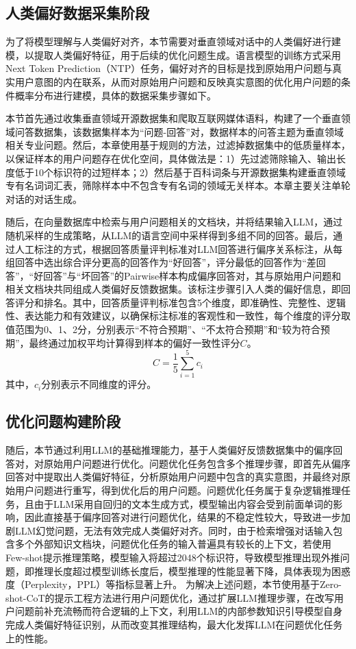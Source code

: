 \subsection{人类偏好数据采集阶段}

为了将模型理解与人类偏好对齐，本节需要对垂直领域对话中的人类偏好进行建模，以提取人类偏好特征，用于后续的优化问题生成。语言模型的训练方式采用Next Token Prediction（NTP）任务，偏好对齐的目标是找到原始用户问题与真实用户意图的内在联系，从而对原始用户问题和反映真实意图的优化用户问题的条件概率分布进行建模，具体的数据采集步骤如下。

本节首先通过收集垂直领域开源数据集和爬取互联网媒体语料，构建了一个垂直领域问答数据集，该数据集样本为“问题-回答”对，数据样本的问答主题为垂直领域相关专业问题。然后，本章使用基于规则的方法，过滤掉数据集中的低质量样本，以保证样本的用户问题存在优化空间，具体做法是：1）先过滤筛除输入、输出长度低于10个标识符的过短样本；2）然后基于百科词条与开源数据集构建垂直领域专有名词词汇表，筛除样本中不包含专有名词的领域无关样本。本章主要关注单轮对话的对话生成。

随后，在向量数据库中检索与用户问题相关的文档块，并将结果输入LLM，通过随机采样的生成策略，从LLM的语言空间中采样得到多组不同的回答。最后，通过人工标注的方式，根据回答质量评判标准对LLM回答进行偏序关系标注，从每组回答中选出综合评分更高的回答作为“好回答”，评分最低的回答作为“差回答”，“好回答”与“坏回答”的Pairwise样本构成偏序回答对，其与原始用户问题和相关文档块共同组成人类偏好反馈数据集。该标注步骤引入人类的偏好信息，即回答评分和排名。其中，回答质量评判标准包含5个维度，即准确性、完整性、逻辑性、表达能力和有效建议，以确保标注标准的客观性和一致性，每个维度的评分取值范围为0、1、2分，分别表示“不符合预期”、“不太符合预期”和“较为符合预期”，最终通过加权平均计算得到样本的偏好一致性评分$C$。
\begin{equation}
	C = \frac{1}{5}\sum_{i=1}^{5}c_i
\end{equation}
其中，$c_i$分别表示不同维度的评分。

\subsection{优化问题构建阶段}

随后，本节通过利用LLM的基础推理能力，基于人类偏好反馈数据集中的偏序回答对，对原始用户问题进行优化。问题优化任务包含多个推理步骤，即首先从偏序回答对中提取出人类偏好特征，分析原始用户问题中包含的真实意图，并最终对原始用户问题进行重写，得到优化后的用户问题。问题优化任务属于复杂逻辑推理任务，且由于LLM采用自回归的文本生成方式，模型输出内容会受到前面单词的影响，因此直接基于偏序回答对进行问题优化，结果的不稳定性较大，导致进一步加剧LLM幻觉问题，无法有效完成人类偏好对齐。同时，由于检索增强对话输入包含多个外部知识文档块，问题优化任务的输入普遍具有较长的上下文，若使用Few-shot提示推理策略，模型输入将超过2048个标识符，导致模型推理出现外推问题，即推理长度超过模型训练长度后，模型推理的性能显著下降，具体表现为困惑度（Perplexity，PPL）等指标显著上升。
为解决上述问题，本节使用基于Zero-shot-CoT的提示工程方法进行用户问题优化，通过扩展LLM推理步骤，在改写用户问题前补充流畅而符合逻辑的上下文，利用LLM的内部参数知识引导模型自身完成人类偏好特征识别，从而改变其推理结构，最大化发挥LLM在问题优化任务上的性能。

